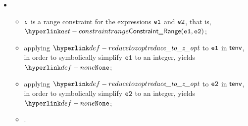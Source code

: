 \begin{itemize}
  \item {}
  \begin{itemize}
    \item $\vc$ is a range constraint for the expressions $\veone$ and $\vetwo$, that is, \\
          $\ConstraintRange(\veone, \vetwo)$;
    \item applying $\reducetozopt$ to $\veone$ in $\tenv$, in order to symbolically simplify $\veone$ to an integer,
          yields $\None$;
    \item applying $\reducetozopt$ to $\vetwo$ in $\tenv$, in order to symbolically simplify $\vetwo$ to an integer,
          yields $\None$;
    \item \Proseeqdef{$\vcopt$}{$\vc$}.
  \end{itemize}
\end{itemize}

\FormallyParagraph
\begin{mathpar}
\end{mathpar}

\begin{mathpar}
\end{mathpar}

\begin{mathpar}
\end{mathpar}

